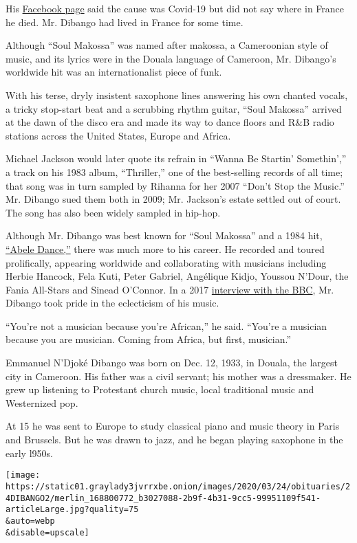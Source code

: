 His
\href{https://www.facebookcorewwwi.onion/ManuDibangoOfficiel}{Facebook
page} said the cause was Covid-19 but did not say where in France he
died. Mr. Dibango had lived in France for some time.

Although ``Soul Makossa'' was named after makossa, a Cameroonian style
of music, and its lyrics were in the Douala language of Cameroon, Mr.
Dibango's worldwide hit was an internationalist piece of funk.

With his terse, dryly insistent saxophone lines answering his own
chanted vocals, a tricky stop-start beat and a scrubbing rhythm guitar,
``Soul Makossa'' arrived at the dawn of the disco era and made its way
to dance floors and R\&B radio stations across the United States, Europe
and Africa.

Michael Jackson would later quote its refrain in ``Wanna Be Startin'
Somethin','' a track on his 1983 album, ``Thriller,'' one of the
best-selling records of all time; that song was in turn sampled by
Rihanna for her 2007 ``Don't Stop the Music.'' Mr. Dibango sued them
both in 2009; Mr. Jackson's estate settled out of court. The song has
also been widely sampled in hip-hop.

Although Mr. Dibango was best known for ``Soul Makossa'' and a 1984 hit,
\href{https://www.youtube.com/watch?v=Ph5GB8RArks}{``Abele Dance,''}
there was much more to his career. He recorded and toured prolifically,
appearing worldwide and collaborating with musicians including Herbie
Hancock, Fela Kuti, Peter Gabriel, Angélique Kidjo, Youssou N'Dour, the
Fania All-Stars and Sinead O'Connor. In a 2017
\href{https://www.bbc.com/news/world-europe-52017834}{interview with the
BBC}, Mr. Dibango took pride in the eclecticism of his music.

``You're not a musician because you're African,'' he said. ``You're a
musician because you are musician. Coming from Africa, but first,
musician.''

Emmanuel N'Djoké Dibango was born on Dec. 12, 1933, in Douala, the
largest city in Cameroon. His father was a civil servant; his mother was
a dressmaker. He grew up listening to Protestant church music, local
traditional music and Westernized pop.

At 15 he was sent to Europe to study classical piano and music theory in
Paris and Brussels. But he was drawn to jazz, and he began playing
saxophone in the early l950s.

\texttt{[image: https://static01.graylady3jvrrxbe.onion/images/2020/03/24/obituaries/24DIBANGO2/merlin\_168800772\_b3027088-2b9f-4b31-9cc5-99951109f541-articleLarge.jpg?quality=75\\\&auto=webp\\\&disable=upscale]}

